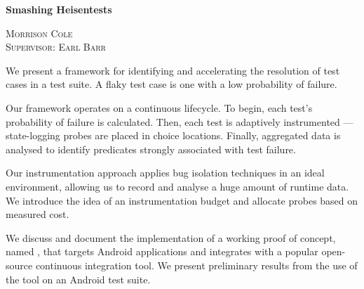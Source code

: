 \begin{titlepage}
\begin{center}

{\huge \bfseries Smashing Heisentests \\[3cm]}

\textsc{\LARGE Morrison Cole}\\[0.5cm]

\textsc{\LARGE Supervisor: Earl Barr}\\[2.5cm]


\end{center}

We present a framework for identifying and accelerating the resolution of \flaky
test cases in a test suite. A flaky test case is one with a low probability of
failure.

Our framework operates on a continuous lifecycle. To begin, each test's
probability of failure is calculated. Then, each test is adaptively instrumented
--- state-logging probes are placed in choice locations. Finally, aggregated
data is analysed to identify predicates strongly associated with test failure.

Our instrumentation approach applies bug isolation techniques in an ideal
environment, allowing us to record and analyse a huge amount of runtime data. We
introduce the idea of an instrumentation budget and allocate probes based on
measured cost.

We discuss and document the implementation of a working proof of concept, named
\venera, that targets Android applications and integrates with a popular
open-source continuous integration tool. We present preliminary results from the
use of the tool on an Android test suite.

\end{titlepage}